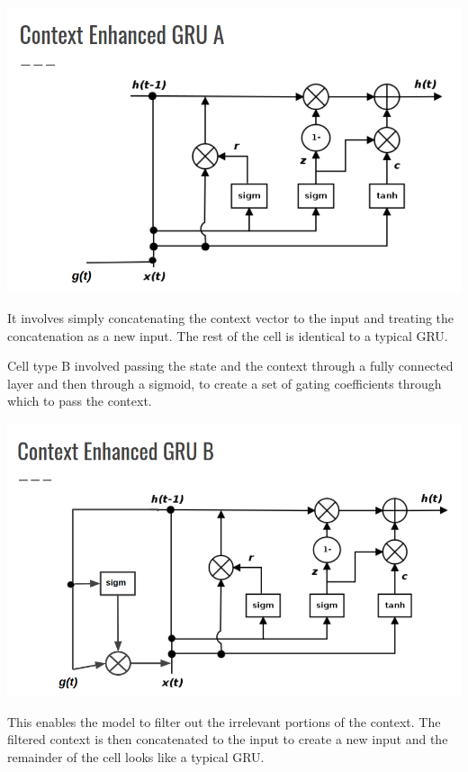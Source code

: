 \documentclass[letterpaper, 10pt]{article}
\begin{document}
\begin{multicols}{2}
\begin{center}
\includegraphics[scale=.2]{context-gru-a}
\end{center}

\noindent It involves simply concatenating the context vector to the input and treating the
concatenation as a new input.
The rest of the cell is identical to a typical GRU.

Cell type B involved passing the state and the context through a fully connected layer and then
through a sigmoid, to create a set of gating coefficients through which to pass the context.

\begin{center}
\includegraphics[scale=.2]{context-gru-b}
\end{center}

This enables the model to filter out the irrelevant portions of the context.
The filtered context is then concatenated to the input to create a new input and the remainder of
the cell looks like a typical GRU.


\end{multicols}
\end{document}

